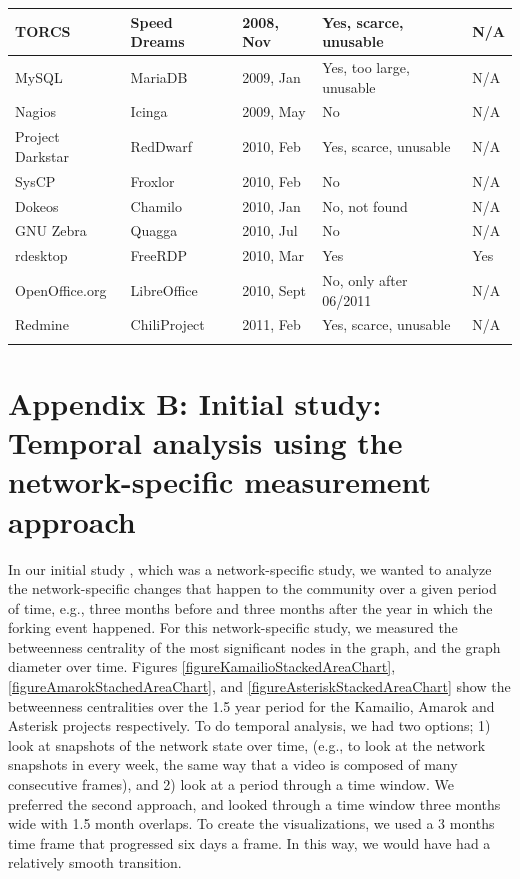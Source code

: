 \documentclass[12pt]{report}
\begin{document}
\begin{appendices}
\begin{table} [H]
\begin{tabular}{m{} m{} m{} m{} m{}}
TORCS & Speed Dreams & 2008, Nov & Yes, scarce, unusable & N/A \\ \hline
MySQL & MariaDB & 2009, Jan & Yes, too large, unusable & N/A\\ \hline
Nagios & Icinga & 2009, May & No & N/A \\ \hline
Project Darkstar& RedDwarf & 2010, Feb & Yes, scarce, unusable & N/A \\ \hline
SysCP & Froxlor & 2010, Feb & No & N/A \\ \hline
Dokeos & Chamilo & 2010, Jan & No, not found & N/A \\ \hline
GNU Zebra & Quagga & 2010, Jul & No & N/A \\ \hline
rdesktop & FreeRDP & 2010, Mar & Yes & Yes \\ \hline
OpenOffice.org & LibreOffice & 2010, Sept & No, only after 06/2011 & N/A \\ \hline
Redmine & ChiliProject & 2011, Feb & Yes, scarce, unusable & N/A \\
\noalign{\smallskip}\hline
\end{tabular}
\end{table}

\pagebreak


\section{Appendix B: Initial study: Temporal analysis using the network-specific measurement approach}
\label{sectionInitialStudy}
In our initial study \cite{AzarbakhtOpenSym2013}\cite{AzarbakhtOSS2013}\cite{AzarbakhtVLHCC2014}, which was a network-specific study, we wanted to analyze the network-specific changes that happen to the community over a given period of time, e.g., three months before and three months after the year in which the forking event happened. For this network-specific study, we measured the betweenness centrality \cite{Brandes} of the most significant nodes in the graph, and the graph diameter over time. Figures \ref{figureKamailioStackedAreaChart}, \ref{figureAmarokStachedAreaChart}, and \ref{figureAsteriskStackedAreaChart} show the betweenness centralities over the 1.5 year period for the Kamailio, Amarok and Asterisk projects respectively. To do temporal analysis, we had two options; 1) look at snapshots of the network state over time, (e.g., to look at the network snapshots in every week, the same way that a video is composed of many consecutive frames), and 2) look at a period through a time window. We preferred the second approach, and looked through a time window three months wide with 1.5 month overlaps. To create the visualizations, we used a 3 months time frame that progressed six days a frame. In this way, we would have had a relatively smooth transition.


\end{appendices}
\end{document}
